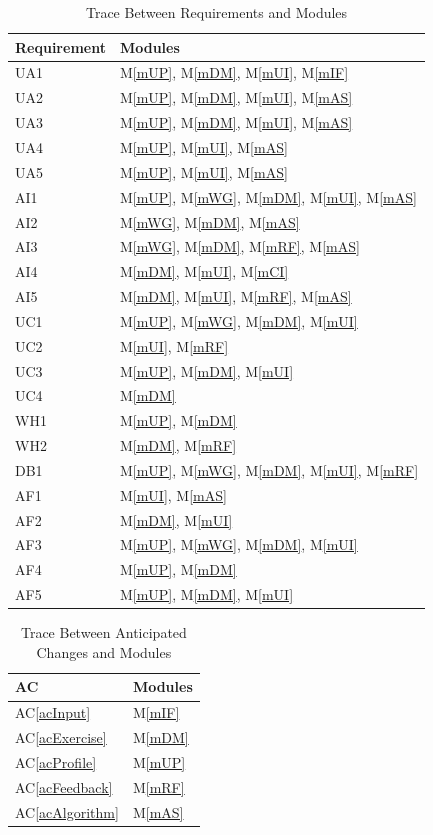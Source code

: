 \documentclass[12pt, titlepage]{article}
\newcommand{\acref}[1]{AC\ref{#1}}
\newcommand{\mref}[1]{M\ref{#1}}
\begin{document}
\begin{table}[H]
\centering
\begin{tabular}{p{} p{}}
\toprule
\textbf{Requirement} & \textbf{Modules}\\
\midrule
UA1 & \mref{mUP}, \mref{mDM}, \mref{mUI}, \mref{mIF}\\
UA2 & \mref{mUP}, \mref{mDM}, \mref{mUI}, \mref{mAS}\\
UA3 & \mref{mUP}, \mref{mDM}, \mref{mUI}, \mref{mAS}\\
UA4 & \mref{mUP}, \mref{mUI}, \mref{mAS}\\
UA5 & \mref{mUP}, \mref{mUI}, \mref{mAS}\\
AI1 & \mref{mUP}, \mref{mWG}, \mref{mDM}, \mref{mUI}, \mref{mAS}\\
AI2 & \mref{mWG}, \mref{mDM}, \mref{mAS}\\
AI3 & \mref{mWG}, \mref{mDM}, \mref{mRF}, \mref{mAS}\\
AI4 & \mref{mDM}, \mref{mUI}, \mref{mCI}\\
AI5 & \mref{mDM}, \mref{mUI}, \mref{mRF}, \mref{mAS}\\
UC1 & \mref{mUP}, \mref{mWG}, \mref{mDM}, \mref{mUI}\\
UC2 & \mref{mUI}, \mref{mRF}\\
UC3 & \mref{mUP}, \mref{mDM}, \mref{mUI}\\
UC4 & \mref{mDM}\\
WH1 & \mref{mUP}, \mref{mDM}\\
WH2 & \mref{mDM}, \mref{mRF}\\
DB1 & \mref{mUP}, \mref{mWG}, \mref{mDM}, \mref{mUI}, \mref{mRF}\\
AF1 & \mref{mUI}, \mref{mAS}\\
AF2 & \mref{mDM}, \mref{mUI}\\
AF3 & \mref{mUP}, \mref{mWG}, \mref{mDM}, \mref{mUI} \\
AF4 & \mref{mUP}, \mref{mDM} \\
AF5 & \mref{mUP}, \mref{mDM}, \mref{mUI}\\
\bottomrule
\end{tabular}
\caption{Trace Between Requirements and Modules}
\label{TblRT}
\end{table}

\begin{table}[H]
\centering
\begin{tabular}{p{} p{}}
\toprule
\textbf{AC} & \textbf{Modules}\\
\midrule
\acref{acInput} & \mref{mIF}\\
\acref{acExercise} & \mref{mDM}\\
\acref{acProfile} & \mref{mUP}\\
\acref{acFeedback} & \mref{mRF}\\
\acref{acAlgorithm} & \mref{mAS}\\
\bottomrule
\end{tabular}
\caption{Trace Between Anticipated Changes and Modules}
\label{TblACT}
\end{table}
\end{document}
